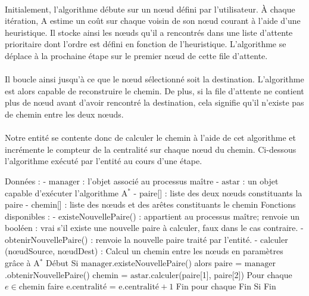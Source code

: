 \documentclass[a4paper, 10pt]{report}
\begin{document}
\paragraph{}Initialement, l'algorithme débute sur un n\oe ud défini par l'utilisateur. À chaque itération, A\up{*} estime un coût sur chaque voisin de son n\oe ud courant à l'aide d'une heuristique. Il stocke ainsi les n\oe uds qu'il a rencontrés dans une liste d'attente prioritaire dont l'ordre est défini en fonction de l'heuristique. L'algorithme se déplace à la prochaine étape sur le premier n\oe ud de cette file d'attente.

\paragraph{}Il boucle ainsi jusqu'à ce que le n\oe ud sélectionné soit la destination. L'algorithme est alors capable de reconstruire le chemin. De plus, si la file d'attente ne contient plus de n\oe ud avant d'avoir rencontré la destination, cela signifie qu'il n'existe pas de chemin entre les deux n\oe uds.

\paragraph{}Notre entité se contente donc de calculer le chemin à l'aide de cet algorithme et incrémente le compteur de la centralité sur chaque n\oe ud du chemin. Ci-dessous l'algorithme exécuté par l'entité au cours d'une étape.

\newpage

\begin{algo}
Données :
	- $\text{manager}$ : l'objet associé au processus maître
	- $\text{astar}$ : un objet capable d'exécuter l'algorithme A$^{*}$
	- $\text{paire}$[] : liste des deux nœuds constituants la paire
	- $\text{chemin}$[] : liste des nœuds et des arêtes constituants le chemin
Fonctions disponibles :
	- $\text{existeNouvellePaire}$() : appartient au processus maître; renvoie un booléen : 
		vrai s'il existe une nouvelle paire à calculer, faux dans le cas contraire.
	- $\text{obtenirNouvellePaire}$() : renvoie la nouvelle paire traité par l'entité.
	- $\text{calculer}$(nœudSource, nœudDest) : Calcul un chemin entre les nœuds en paramètres grâce à A$^*$
Début
	Si $\text{manager}$.existeNouvellePaire() alors
		$\text{paire}$ = $\text{manager}$.obtenirNouvellePaire()
		$\text{chemin}$ = $\text{astar}$.calculer(paire[1], paire[2])
		Pour chaque $e \in \text{chemin}$ faire
			$\text{e.centralité}$ = $\text{e.centralité} + 1 $
		Fin pour chaque
	Fin Si
Fin
\end{algo}
\end{document}
